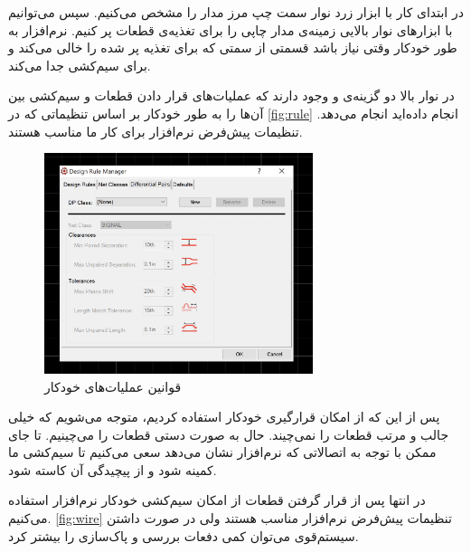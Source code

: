 در ابتدای کار با ابزار زرد نوار سمت چپ مرز مدار را مشخص می‌کنیم. سپس می‌توانیم با ابزارهای نوار بالایی زمینه‌ی مدار چاپی را برای تغذیه‌ی قطعات پر کنیم.
نرم‌افزار به طور خودکار وقتی نیاز باشد قسمتی از سمتی که برای تغذیه پر شده را خالی می‌کند و برای سیم‌کشی جدا می‌کند.

در نوار بالا دو گزینه‌ی
و
وجود دارند که عملیات‌های قرار دادن قطعات و 
سیم‌کشی بین آن‌ها را به طور خودکار بر اساس
تنظیماتی که در
\eqref{fig:rule}
انجام داده‌اید انجام می‌دهد.
تنظیمات پیش‌فرض نرم‌افزار برای کار ما مناسب هستند.

\begin{figure}[h!]
    \centering
    \includegraphics[width=0.7\textwidth]{images/ALU-PCB-Rule.png}
    \caption{
    قوانین عملیات‌های خودکار
    }
    \label{fig:rule}
\end{figure}

پس از این که از امکان قرارگیری خودکار استفاده کردیم، متوجه می‌شویم که خیلی جالب و مرتب قطعات را نمی‌چیند.
حال به صورت دستی قطعات را می‌چینیم. تا جای ممکن با توجه به اتصالاتی که نرم‌افزار نشان می‌دهد سعی می‌کنیم تا سیم‌کشی ما کمینه شود و از پیچیدگی آن کاسته شود.

در انتها پس از قرار گرفتن قطعات از امکان سیم‌کشی خودکار نرم‌افزار استفاده می‌کنیم.
\eqref{fig:wire}
تنظیمات پیش‌فرض نرم‌افزار مناسب هستند ولی در صورت داشتن سیستم‌قوی می‌توان کمی دفعات بررسی و پاک‌سازی را بیشتر کرد.

